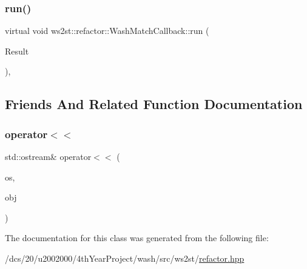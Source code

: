 \mbox{\label{classws2st_1_1refactor_1_1WashMatchCallback_a1712bb28c2728b43b5ca0f2d682382a6}} 
\subsubsection{\texorpdfstring{run()}{run()}}
{\footnotesize\ttfamily virtual void ws2st\+::refactor\+::\+Wash\+Match\+Callback\+::run (\begin{DoxyParamCaption}\item[{const Match\+Finder\+::\+Match\+Result \&}]{Result }\end{DoxyParamCaption})\hspace{0.3cm}{\ttfamily [inline]}, {\ttfamily [virtual]}}



\subsection{Friends And Related Function Documentation}
\mbox{\label{classws2st_1_1refactor_1_1WashMatchCallback_a0038f6cb22cb01fa32430f4857862513}} 
\subsubsection{\texorpdfstring{operator$<$$<$}{operator<<}}
{\footnotesize\ttfamily std\+::ostream\& operator$<$$<$ (\begin{DoxyParamCaption}\item[{std\+::ostream \&}]{os,  }\item[{const \mbox{\hyperlink{classws2st_1_1refactor_1_1WashMatchCallback}{Wash\+Match\+Callback}} \&}]{obj }\end{DoxyParamCaption})\hspace{0.3cm}{\ttfamily [friend]}}



The documentation for this class was generated from the following file\+:\begin{DoxyCompactItemize}
\item 
/dcs/20/u2002000/4th\+Year\+Project/wash/src/ws2st/\mbox{\hyperlink{refactor_8hpp}{refactor.\+hpp}}\end{DoxyCompactItemize}
